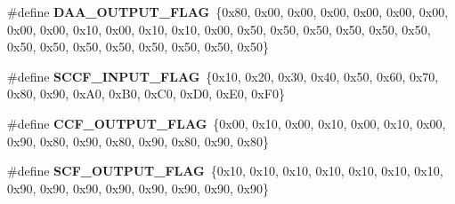 \begin{DoxyCompactItemize}
\#define {\bfseries D\+A\+A\+\_\+\+O\+U\+T\+P\+U\+T\+\_\+\+F\+L\+AG}~\{0x80, 0x00, 0x00, 0x00, 0x00, 0x00, 0x00, 0x00, 0x00, 0x10, 0x00, 0x10, 0x10, 0x00, 0x50, 0x50, 0x50, 0x50, 0x50, 0x50, 0x50, 0x50, 0x50, 0x50, 0x50, 0x50, 0x50, 0x50\}
\item 
\mbox{\label{unit-test-cpu-dispatch_8c_af7f1246e8d6b657ec148c22b78378c7e}} 
\#define {\bfseries S\+C\+C\+F\+\_\+\+I\+N\+P\+U\+T\+\_\+\+F\+L\+AG}~\{0x10, 0x20, 0x30, 0x40, 0x50, 0x60, 0x70, 0x80, 0x90, 0x\+A0, 0x\+B0, 0x\+C0, 0x\+D0, 0x\+E0, 0x\+F0\}
\item 
\mbox{\label{unit-test-cpu-dispatch_8c_a9966f2a5032c87f3e9ec3f8cc45e0711}} 
\#define {\bfseries C\+C\+F\+\_\+\+O\+U\+T\+P\+U\+T\+\_\+\+F\+L\+AG}~\{0x00, 0x10, 0x00, 0x10, 0x00, 0x10, 0x00, 0x90, 0x80, 0x90, 0x80, 0x90, 0x80, 0x90, 0x80\}
\item 
\mbox{\label{unit-test-cpu-dispatch_8c_aeafe05c465e74f4b6dada56503c3b261}} 
\#define {\bfseries S\+C\+F\+\_\+\+O\+U\+T\+P\+U\+T\+\_\+\+F\+L\+AG}~\{0x10, 0x10, 0x10, 0x10, 0x10, 0x10, 0x10, 0x90, 0x90, 0x90, 0x90, 0x90, 0x90, 0x90, 0x90\}
\end{DoxyCompactItemize}
